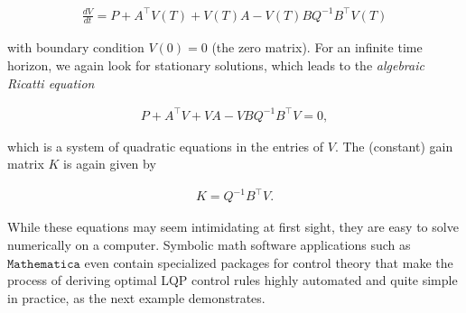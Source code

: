 \documentclass[11pt]{report}
\theoremstyle{plain}
\theoremstyle{definition}
\begin{document}
\begin{align*}
\frac{dV}{dt} = P + A^\top V(T) + V(T) A - V(T) B Q^{-1} B^\top V(T)
\end{align*}

with boundary condition $V(0) = 0$ (the zero matrix).
For an infinite time horizon, we again look for
stationary solutions, which leads to the \emph{algebraic
Ricatti equation}

\begin{align*}
P + A^\top V + V A - V B Q^{-1} B^\top V = 0,
\end{align*}

which is a system of quadratic equations in the
entries of $V$. The (constant) gain matrix $K$ is
again given by

\begin{align*}
K = Q^{-1}B^\top V.
\end{align*}

While these equations may seem intimidating at first
sight, they are easy to solve numerically on a
computer. Symbolic math software applications such as
$\texttt{Mathematica}$ even contain specialized
packages for control theory that make the process of
deriving optimal LQP control rules highly automated
and quite simple in practice, as the next example
demonstrates.
\end{document}
